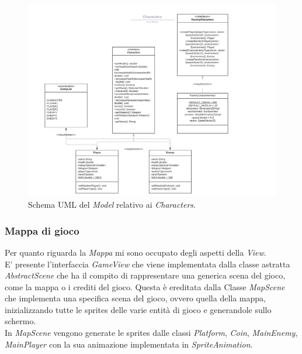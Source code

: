 \begin{figure}[H]
	\centering{}
	\includegraphics[width=1.2\textwidth]{./img/characters_uml.png} 
	\caption{Schema UML del \emph{Model} relativo ai \emph{Characters}.}
	\label{img:uml_model_characters}
\end{figure}

\subsubsection*{Mappa di gioco} %

\textsf{\small Per quanto riguarda la \emph{Mappa} mi sono occupato degli aspetti della \emph{View}.}\\

\textsf{\small E' presente l'interfaccia \emph{GameView} che viene implementata dalla classe astratta \emph{AbstractScene} che ha il compito di rappresentare una generica scena del gioco, come la mappa o i crediti del gioco. Questa è ereditata dalla Classe \emph{MapScene} che implementa una specifica scena del gioco, ovvero quella della mappa, inizializzando tutte le sprites delle varie entità di gioco e generandole sullo schermo.}\\

\textsf{\small In \emph{MapScene} vengono generate le sprites dalle classi \emph{Platform}, \emph{Coin}, \emph{MainEnemy}, \emph{MainPlayer} con la sua animazione implementata in \emph{SpriteAnimation}.}\\

